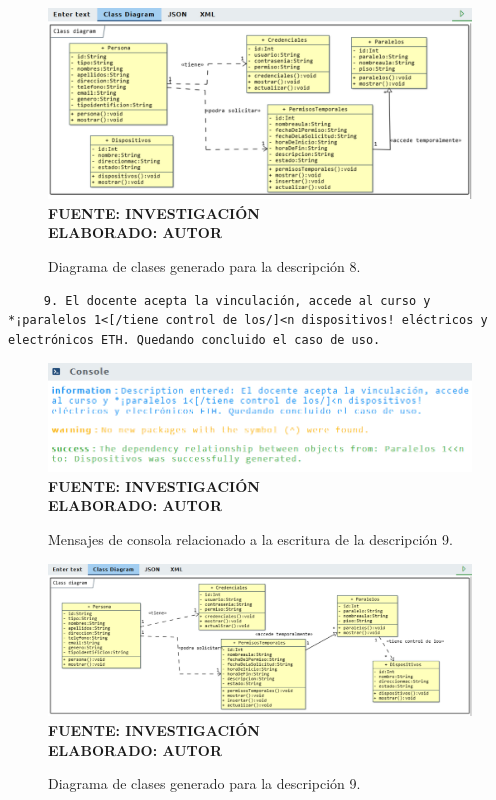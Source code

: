 \begin{figure}[H]
	\centering
	\caption{Diagrama de clases generado para la descripción 8.}
	\includegraphics[width=15cm]{img/dc-eva-008.png}
	\label{fig:dc_eva_008}
	\vspace{4mm}
	{\footnotesize \textbf{\\ FUENTE: INVESTIGACIÓN} \textbf{\\ ELABORADO: AUTOR}}
\end{figure}

\begin{lstlisting}
	 9. El docente acepta la vinculación, accede al curso y  *¡paralelos 1<[/tiene control de los/]<n dispositivos! eléctricos y electrónicos ETH. Quedando concluido el caso de uso.
\end{lstlisting}

     \begin{figure}[h!]
     	\centering
	\caption{Mensajes de consola relacionado a la escritura de la descripción 9.}
	\includegraphics[width=14cm]{img/not-eva-009.png}
	\label{fig:not_eva_009}
	\vspace{4mm}
	{\footnotesize \textbf{\\ FUENTE: INVESTIGACIÓN} \textbf{\\ ELABORADO: AUTOR}}
\end{figure}

\begin{figure}[H]
	\centering
	\caption{Diagrama de clases generado para la descripción 9.}
	\includegraphics[width=15cm]{img/dc-eva-009.png}
	\label{fig:dc_eva_009}
	\vspace{4mm}
	{\footnotesize \textbf{\\ FUENTE: INVESTIGACIÓN} \textbf{\\ ELABORADO: AUTOR}}
\end{figure}

